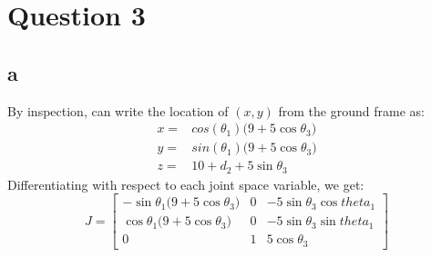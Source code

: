 \documentclass[11pt]{article}
\begin{document}
\section*{Question 3}
\subsection*{a}
By inspection, can write the location of $(x,y)$ from the ground frame as:
\begin{align*}
x=&cos(\theta_1)\big(9+5\cos{\theta_3}\big)\\
y=&sin(\theta_1)\big(9+5\cos{\theta_3}\big)\\
z=&10+d_2+5\sin{\theta_3}
\end{align*}
Differentiating with respect to each joint space variable, we get:
$$
J=
\begin{bmatrix}
    -\sin{\theta_1}\big(9+5\cos{\theta_3}\big) & 0 & -5\sin{\theta_3}\cos{theta_1}\\
    \cos{\theta_1}\big(9+5\cos{\theta_3}\big) & 0 & -5\sin{\theta_3}\sin{theta_1}\\
    0 & 1 & 5\cos{\theta_3}
\end{bmatrix}
$$
\end{document}
